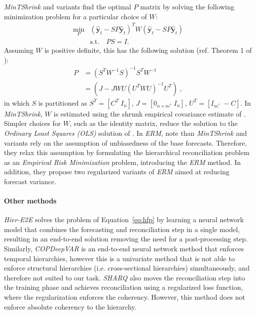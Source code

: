 \documentclass[preprint, 3p, times, twocolumn]{elsarticle}
\begin{document}
\textit{MinTShrink} \cite{wickramasuriya_optimal_2019} and variants find the optimal \(P\) matrix by solving the following minimization problem for a particular choice of \(W\):
\begin{align}
  \min_P &(\hat{\textbf{y}}_{t} - SP\hat{\textbf{y}}_{t})^T W (\hat{\textbf{y}}_{t} - SP\hat{\textbf{y}}_{t}) \nonumber \\
  & \text{s.t.} \quad PS=I. \label{eq:minp}
\end{align}
Assuming \(W\) is positive definite, this has the following solution (ref. Theorem 1 of \cite{wickramasuriya_optimal_2019}):
\begin{align} 
  P &= (S^TW^{-1}S)^{-1}S^TW^{-1} \nonumber \\
    &= (J - JWU(U^TWU)^{-1}U^T) \;, \label{eq:p1}
\end{align}
in which \(S\) is partitioned as \(S^T = [C^T \; I_n]\), \(J = [0_{n \times m^*} \; I_n]\), \(U^T = [I_{m^*} \; -C]\). In \textit{MinTShrink}, \(W\) is estimated using the shrunk empirical covariance estimate of \cite{schafer_shrinkage_2005}. Simpler choices for \(W\), such as the identity matrix, reduce the solution to the \textit{Ordinary Least Squares (OLS)} solution of \cite{hyndman_optimal_2011}. In \textit{ERM}, \citet{bentaieb_regularized_2019} note than \textit{MinTShrink} and variants rely on the assumption of unbiasedness of the base forecasts. Therefore, they relax this assumption by formulating the hierarchical reconciliation problem as an \textit{Empirical Risk Minimization} problem, introducing the \textit{ERM} method. In addition, they propose two regularized variants of \textit{ERM} aimed at reducing forecast variance. 

\paragraph{Other methods} \textit{Hier-E2E} \cite{rangapuram_endtoend_2021} solves the problem of Equation~\eqref{eq:hfp} by learning a neural network model that combines the forecasting and reconciliation step in a single model, resulting in an end-to-end solution removing the need for a post-processing step. Similarly, \textit{COPDeepVAR} \cite{rangapuram_coherent_2023} is an end-to-end neural network method that enforces temporal hierarchies, however this is a univariate method that is not able to enforce structural hierarchies (i.e. cross-sectional hierarchies) simultaneously, and therefore not suited to our task. \textit{SHARQ} \cite{han_simultaneously_2021} also moves the reconciliation step into the training phase and achieves reconciliation using a regularized loss function, where the regularization enforces the coherency. However, this method does not enforce absolute coherency to the hierarchy.
\end{document}
